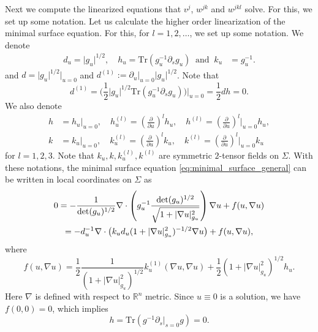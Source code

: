 \documentclass[12pt]{amsart}
\def\p{\partial}
\def\R{\mathbb R}
\theoremstyle{definition}
\theoremstyle{remark}
\newcommand{\abs}[1]{\lvert #1 \rvert}
\newcommand{\s}{\hspace{0.5pt}}
\begin{document}
Next we compute the linearized equations that $v^{j}$, $w^{jk}$ and $w^{jkl}$ solve. For this, we set up some notation. 
Let us calculate the higher order linearization of the minimal surface equation. For this, for $l=1,2,\ldots$, we set up some notation. We denote
\begin{align*}
 d_u=\abs{g_u}^{1/2}, \quad h_u=\text{Tr}(g_u^{-1}\p_sg_u) \ \text{ and } \ k_u&=g_u^{-1}.
 \end{align*}
and $d=\abs{g_u}^{1/2}|_{u=0}$ and $d^{(1)}:=\p_u|_{u=0}\abs{g_u}^{1/2}$. 
Note that 
\begin{equation}\label{eq:first_der_of_d_zero}
 d^{(1)}=\Big(\frac{1}{2}\abs{g_u}^{1/2}\text{Tr}(g_u^{-1}\p_sg_u)\Big)\Big|_{u=0}=\frac{1}{2}dh=0.
\end{equation}
We also denote
\begin{align*}
h&=h_u|_{u=0},  \quad h^{(l)}_u=\left(\frac{\p}{\p u}\right)^lh_u, \quad h^{(l)}=\left(\frac{\p}{\p u}\right)^l\Big|_{u=0}h_u, \\
 k&=k_u|_{u=0}, \quad  k^{(l)}_u=\left(\frac{\p}{\p u}\right)^lk_u, \quad k^{(l)}=\left(\frac{\p}{\p u}\right)^l\Big|_{u=0}k_u 
\end{align*}
for $l=1,2,3$. 
Note that $k_u,k,k^{(l)}_u, k^{(l)}$ are symmetric $2$-tensor fields on $\Sigma$. 
With these notations, the minimal surface equation \eqref{eq:minimal_surface_general} can be written in local coordinates on $\Sigma$ as 
\begin{multline*}%
 0=-\frac{1}{\det(g_u)^{1/2}}\nabla\cdot \left( g_u^{-1}\frac{\det(g_u)^{1/2}}{\sqrt{1+\abs{\nabla u}^2_{g_u}}} \right)\nabla u + f(u,\nabla u)  \\
 =-d_u^{-1}\s \nabla\cdot\big(k_ud_u(1+\abs{\nabla u}^2_{g_u})^{-1/2}\nabla u\big)+f(u,\nabla u), 
\end{multline*}
where
\[
 f(u,\nabla u)=\frac{1}{2}\frac{1}{(1+\abs{\nabla u}^2_{g_u})^{1/2}}k_u^{(1)}(\nabla u,\nabla u)+\frac{1}{2}(1+\abs{\nabla u}^2_{g_u})^{1/2}h_u. %
\]
Here $\nabla$ is defined with respect to $\R^n$ metric. 
Since $u\equiv 0$ is a solution, we have $f(0,0)=0$, which implies 
\begin{equation}\label{eq_h_equiv_0}
h=\text{Tr}(g^{-1}\p_s|_{s=0}g)=0. 
\end{equation}
\end{document}

